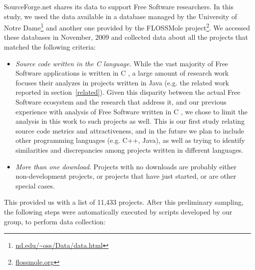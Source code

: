 \documentclass[conference]{IEEEtran}
\begin{document}
SourceForge.net shares its data to support Free Software researchers.
%
In this study, we used the data available in a database managed by
the University of Notre Dame\footnote{\url{nd.edu/~oss/Data/data.html}}
and another one provided by the FLOSSMole project\footnote{\url{flossmole.org}}.
%
We accessed these databases in November, 2009 and collected data about
all the projects that matched the following criteria:
%
\begin{itemize}
\item \emph{Source code written in the C language}. 
While the vast majority of Free Software applications is written in
C \cite{robles2006:mining-large}, a large amount of research work
focuses their analyzes in projects written in Java (e.g. the related
work reported in section~\ref{related}).
%
Given this disparity between the actual Free Software ecosystem and
the research that address it, and our previous experience with
analysis of Free Software written in C \cite{terceiro2009}, we
chose to limit the analysis in this work to such projects as well.
%
This is our first study relating source code metrics and
attractiveness, and in the future we plan to include other
programming languages (e.g. C++, Java), as well as trying to
identify similarities and discrepancies among projects written in
different languages.

\item \emph{More than one download}.  Projects with no downloads are
probably either non-development projects, or projects that have just started,
or are other special cases.
\end{itemize}

This provided us with a list of 11,433 projects. After this preliminary sampling,
the following steps were automatically executed  by scripts developed by our group,
to perform data collection:
\end{document}
